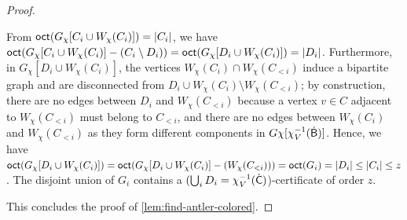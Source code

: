 \begin{proof}
\begin{claimproof}
      From $\textnormal{\textsf{oct}}(G_\chi[C_i \cup W_\chi(C_i)]) = |C_i|$, we have
      $\textnormal{\textsf{oct}}(G_\chi[C_i \cup W_\chi(C_i)] - (C_i \setminus D_i)) = \textnormal{\textsf{oct}}(G_\chi[D_i \cup W_\chi(C_i)]) = |D_i|$.
      Furthermore, in $G_\chi[D_i \cup W_\chi(C_i)]$,
      the vertices $W_\chi(C_i) \cap W_\chi(C_{<i})$ induce a bipartite graph
      and are disconnected from $D_i \cup W_\chi(C_i) \setminus W_\chi(C_{<i})$;
      by construction, there are no edges between $D_i$ and $W_\chi(C_{<i})$
      because a vertex $v \in C$ adjacent to $W_\chi(C_{<i})$ must belong to $C_{<i}$,
      and there are no edges between $W_\chi(C_i)$ and $W_\chi(C_{<i})$ as they form different components in $G\chi[\chi_V^{-1}(\mathsf{\dot{B}})]$.
      Hence, we have $\textnormal{\textsf{oct}}(G_\chi[D_i \cup W_\chi(C_i)]) = \textnormal{\textsf{oct}}(G_\chi[D_i \cup W_\chi(C_i)] - (W_\chi(C_{<i}))) = \textnormal{\textsf{oct}}(G_i) = |D_i|\leq |C_i|\leq z$.
      The disjoint union of $G_i$ contains a $(\bigcup_i D_i= \chi_V^{-1}(\mathsf{\dot{C}})$)-certificate of order $z$.
  \end{claimproof}
	
This concludes the proof of \cref{lem:find-antler-colored}.
\end{proof}

\thmMain*

